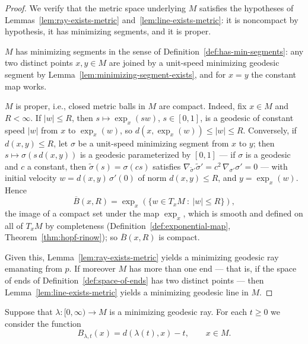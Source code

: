 \begin{proof}
We verify that the metric space underlying $M$ satisfies the
hypotheses of Lemmas~\ref{lem:ray-exists-metric}
and~\ref{lem:line-exists-metric}: it is noncompact by hypothesis, it
has minimizing segments, and it is proper.

$M$ has minimizing segments in the sense of
Definition~\ref{def:has-min-segments}: any two distinct points
$x,y\in M$ are joined by a unit-speed minimizing geodesic segment by
Lemma~\ref{lem:minimizing-segment-exists}, and for $x=y$ the
constant map works.

$M$ is proper, i.e., closed metric balls in $M$ are compact. Indeed,
fix $x\in M$ and $R<\infty$. If $|w|\le R$, then
$s\mapsto\exp_x(sw)$, $s\in[0,1]$, is a geodesic of constant speed
$|w|$ from $x$ to $\exp_x(w)$, so $d(x,\exp_x(w))\le|w|\le R$.
Conversely, if $d(x,y)\le R$, let $\sigma$ be a unit-speed
minimizing segment from $x$ to $y$; then $s\mapsto\sigma(s\,d(x,y))$
is a geodesic parameterized by $[0,1]$ --- if $\sigma$ is a geodesic
and $c$ a constant, then $\tilde\sigma(s)=\sigma(cs)$ satisfies
$\nabla_{\tilde\sigma'}\tilde\sigma'
=c^2\,\nabla_{\sigma'}\sigma'=0$ --- with initial velocity
$w=d(x,y)\,\sigma'(0)$ of norm $d(x,y)\le R$, and $y=\exp_x(w)$.
Hence
$$\overline{B}(x,R)=\exp_x\left(\{w\in T_xM\ :\ |w|\le R\}\right),$$
the image of a compact set under the map $\exp_x$, which is smooth
and defined on all of $T_xM$ by completeness
(Definition~\ref{def:exponential-map},
Theorem~\ref{thm:hopf-rinow}); so $\overline{B}(x,R)$ is compact.

Given this, Lemma~\ref{lem:ray-exists-metric} yields a minimizing
geodesic ray emanating from $p$. If moreover $M$ has more than one
end --- that is, if the space of ends of
Definition~\ref{def:space-of-ends} has two distinct points --- then
Lemma~\ref{lem:line-exists-metric} yields a minimizing geodesic
line in $M$.
\end{proof}



\begin{definition}
\label{def:busemann-approx}
\leanok
{}
Suppose that $\lambda\colon [0,\infty)\to M$ is a minimizing
geodesic ray. For each $t\ge 0$ we consider the function
$$B_{\lambda,t}(x)=d(\lambda(t),x)-t,\qquad x\in M.$$
\end{definition}

